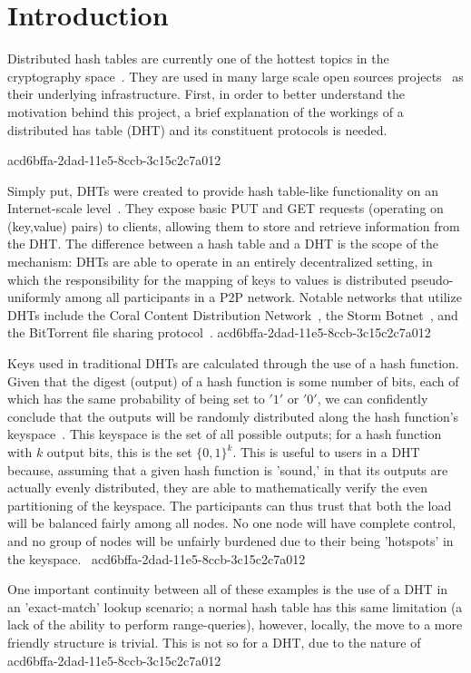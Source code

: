 \documentclass[12pt]{article}
\begin{document}
\section{Introduction}
\par Distributed hash tables are currently one of the hottest topics in the cryptography space~\cite{Stoica:2001dj,Rowstron:2001ea,Ratnasamy:2001wn}. They are used in many large scale open sources projects~\cite{Freitas:2013tb,Xu:2010vs,Perfitt:2010fh} as their underlying infrastructure. First, in order to better understand the motivation behind this project, a brief explanation of the workings of a distributed has table (DHT) and its constituent protocols is needed.

acd6bffa-2dad-11e5-8ccb-3c15c2c7a012\par Simply put, DHTs were created to provide hash table-like functionality on an Internet-scale level~\cite{Ratnasamy:2001wn}. They expose basic PUT and GET requests (operating on (key,value) pairs) to clients, allowing them to store and retrieve information from the DHT. The difference between a hash table and a DHT is the scope of the mechanism: DHTs are able to operate in an entirely decentralized setting, in which the responsibility for the mapping of keys to values is distributed pseudo-uniformly among all participants in a P2P network. Notable networks that utilize DHTs include the Coral Content Distribution Network~\cite{Freedman:2004vb}, the Storm Botnet~\cite{Holz:2008uk}, and the BitTorrent file sharing protocol~\cite{Cohen:y1_8mBnw}.
acd6bffa-2dad-11e5-8ccb-3c15c2c7a012
\par Keys used in traditional DHTs are calculated through the use of a hash function. Given that the digest (output) of a hash function is some number of bits, each of which has the same probability of being set to $'1'$ or $'0'$, we can confidently conclude that the outputs will be randomly distributed along the hash function's keyspace~. This keyspace is the set of all possible outputs; for a hash function with $k$ output bits, this is the set $\{0,1\}^k$. This is useful to users in a DHT because, assuming that a given hash function is 'sound,' in that its outputs are actually evenly distributed, they are able to mathematically verify the even partitioning of the keyspace. The participants can thus trust that both the load will be balanced fairly among all nodes. No one node will have complete control, and no group of nodes will be unfairly burdened due to their being 'hotspots' in the keyspace.~
acd6bffa-2dad-11e5-8ccb-3c15c2c7a012
\par One important continuity between all of these examples is the use of a DHT in an 'exact-match' lookup scenario; a normal hash table has this same limitation (a lack of the ability to perform range-queries), however, locally, the move to a more friendly structure is trivial. This is not so for a DHT, due to the nature of
\printbibliography
acd6bffa-2dad-11e5-8ccb-3c15c2c7a012
\end{document}
